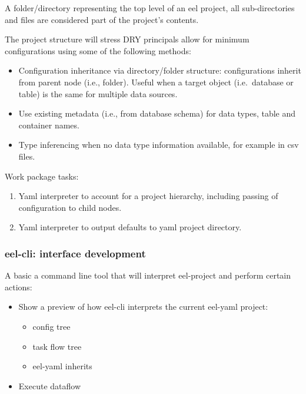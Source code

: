 A folder/directory representing the top level of an eel project, all
sub-directories and files are considered part of the project's contents.

The project structure will stress DRY principals allow for minimum
configurations using some of the following methods:

\begin{itemize}
\item
  Configuration inheritance via directory/folder structure:
  configurations inherit from parent node (i.e., folder). Useful when a
  target object (i.e.~database or table) is the same for multiple data
  sources.
\item
  Use existing metadata (i.e., from database schema) for data types,
  table and container names.
\item
  Type inferencing when no data type information available, for example
  in csv files.
\end{itemize}

Work package tasks:

\begin{enumerate}
\def\labelenumi{\arabic{enumi}.}
\tightlist
\item
  Yaml interpreter to account for a project hierarchy, including passing
  of configuration to child nodes.
\item
  Yaml interpreter to output defaults to yaml project directory.
\end{enumerate}

\subsubsection{eel-cli: interface
development}\label{eel-cli-interface-development}

A basic a command line tool that will interpret eel-project and perform
certain actions:

\begin{itemize}
\tightlist
\item
  Show a preview of how eel-cli interprets the current eel-yaml project:

  \begin{itemize}
  \tightlist
  \item
    config tree
  \item
    task flow tree
  \item
    eel-yaml inherits
  \end{itemize}
\item
  Execute dataflow
\end{itemize}

